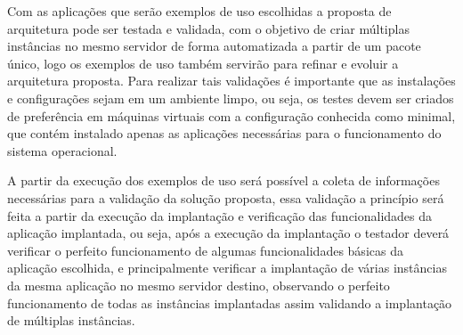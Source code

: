 Com as aplicações que serão exemplos de uso escolhidas a proposta de arquitetura
pode ser testada e validada, com o objetivo de criar múltiplas instâncias
no mesmo servidor de forma automatizada a partir de um pacote único, logo os
exemplos de uso também servirão para refinar e evoluir a arquitetura proposta.
Para realizar tais validações é importante que as instalações e configurações
sejam em um ambiente limpo, ou seja, os testes devem ser criados de preferência
em máquinas virtuais com a configuração conhecida como minimal, que contém
instalado apenas as aplicações necessárias para o funcionamento do sistema operacional.

A partir da execução dos exemplos de uso será possível a coleta de informações
necessárias para a validação da solução proposta, essa validação a princípio
será feita a partir da execução da implantação e verificação das funcionalidades
da aplicação implantada, ou seja, após a execução da implantação o testador deverá
verificar o perfeito funcionamento de algumas funcionalidades básicas da aplicação
escolhida, e principalmente verificar a implantação de várias instâncias da mesma
aplicação no mesmo servidor destino, observando o perfeito funcionamento de todas as
instâncias implantadas assim validando a implantação de múltiplas instâncias.
